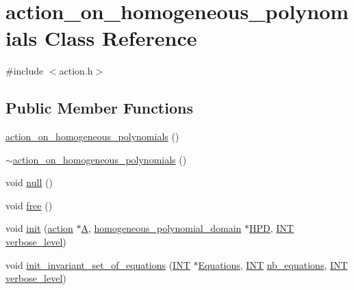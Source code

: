\hypertarget{classaction__on__homogeneous__polynomials}{}\section{action\+\_\+on\+\_\+homogeneous\+\_\+polynomials Class Reference}
\label{classaction__on__homogeneous__polynomials}


{\ttfamily \#include $<$action.\+h$>$}

\subsection*{Public Member Functions}
\begin{DoxyCompactItemize}
\item 
\mbox{\hyperlink{classaction__on__homogeneous__polynomials_a371c102746788023d4b1baa4db1ec98d}{action\+\_\+on\+\_\+homogeneous\+\_\+polynomials}} ()
\item 
\mbox{\hyperlink{classaction__on__homogeneous__polynomials_a550f6c907121fc76aa37dca6a5a0ee06}{$\sim$action\+\_\+on\+\_\+homogeneous\+\_\+polynomials}} ()
\item 
void \mbox{\hyperlink{classaction__on__homogeneous__polynomials_ae7bfa2850b5d97dbbe5f8effdfb5a268}{null}} ()
\item 
void \mbox{\hyperlink{classaction__on__homogeneous__polynomials_a302a2cb060c4808c8ee80c70a19fd61b}{free}} ()
\item 
void \mbox{\hyperlink{classaction__on__homogeneous__polynomials_aeb2f13aba300d45eafb7fc4bc64711ac}{init}} (\mbox{\hyperlink{classaction}{action}} $\ast$\mbox{\hyperlink{classaction__on__homogeneous__polynomials_a5bfe42cc79e244bdad9493240bdae3ef}{A}}, \mbox{\hyperlink{classhomogeneous__polynomial__domain}{homogeneous\+\_\+polynomial\+\_\+domain}} $\ast$\mbox{\hyperlink{classaction__on__homogeneous__polynomials_a500d36c65db821772b06e195374e9eb3}{H\+PD}}, \mbox{\hyperlink{galois_8h_a09fddde158a3a20bd2dcadb609de11dc}{I\+NT}} \mbox{\hyperlink{simeon_8_c_a818073fbcc2f439e7c56952f67386122}{verbose\+\_\+level}})
\item 
void \mbox{\hyperlink{classaction__on__homogeneous__polynomials_a94f2f869d6240110d3fe5914c022753c}{init\+\_\+invariant\+\_\+set\+\_\+of\+\_\+equations}} (\mbox{\hyperlink{galois_8h_a09fddde158a3a20bd2dcadb609de11dc}{I\+NT}} $\ast$\mbox{\hyperlink{classaction__on__homogeneous__polynomials_af06a5a4be82cb6e293c208dafd0a4a47}{Equations}}, \mbox{\hyperlink{galois_8h_a09fddde158a3a20bd2dcadb609de11dc}{I\+NT}} \mbox{\hyperlink{classaction__on__homogeneous__polynomials_ae5660ab14ba177d555d60fdcc7af6f04}{nb\+\_\+equations}}, \mbox{\hyperlink{galois_8h_a09fddde158a3a20bd2dcadb609de11dc}{I\+NT}} \mbox{\hyperlink{simeon_8_c_a818073fbcc2f439e7c56952f67386122}{verbose\+\_\+level}})

\end{DoxyCompactItemize}
